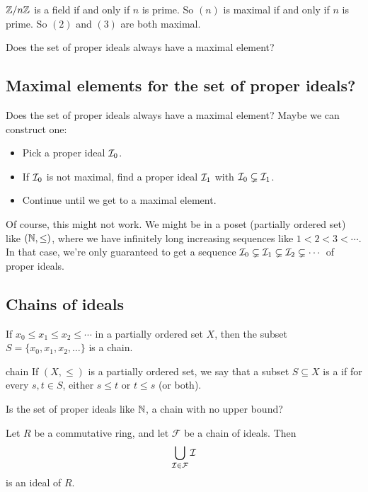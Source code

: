 \documentclass[12pt,letterpaper]{report}
\begin{document}
\begin{ex}
  $\mathbb{Z}/{n}\mathbb{Z}$ is a field if and only if $n$ is prime.
  So $(n)$ is maximal if and only if $n$ is prime.
  So $(2)$ and $(3)$ are both maximal.
\end{ex}

Does the set of proper ideals always have a maximal element?

\pagebreak
\subsection{Maximal elements for the set of proper ideals?}

Does the set of proper ideals always have a maximal element?
Maybe we can construct one:
\begin{itemize}
  \item Pick a proper ideal $\mathcal{I}_0$.
  \item If $\mathcal{I}_0$ is not maximal, find a proper ideal $\mathcal{I}_1$ with
    $\mathcal{I}_0 \subsetneq \mathcal{I}_1$.
  \item Continue until we get to a maximal element.
\end{itemize}

Of course, this might not work.
We might be in a poset (partially ordered set) like $(\mathbb{N}, \leq)$, where we have infinitely long
increasing sequences like $1 < 2 < 3 < \cdots$.
In that case, we're only guaranteed to get a sequence
$\mathcal{I}_0 \subsetneq \mathcal{I}_1 \subsetneq \mathcal{I}_2 \subsetneq \cdots$ of proper ideals.

\pagebreak
\subsection{Chains of ideals}

If $x_0 \leq x_1 \leq x_2 \leq \cdots$ in a partially ordered set $X$, then the subset
$S = \{x_0, x_1, x_2, \ldots\}$ is a chain.

\begin{defn}{chain}{}
  If $(X, \leq)$ is a partially ordered set, we say that a subset $S \subseteq X$ is a 
  if for every $s, t \in S$, either $s \leq t$ or $t \leq s$ (or both).
\end{defn}

Is the set of proper ideals like $\mathbb{N}$, a chain with no upper bound?

\begin{lem}{}{}
  Let $R$ be a commutative ring, and let $\mathcal{F}$ be a chain of ideals.
  Then
  \[ \bigcup_{\mathcal{I} \in \mathcal{F}} \mathcal{I} \]
  is an ideal of $R$.
\end{lem}
\end{document}
